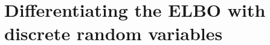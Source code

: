 \documentclass{article} %
\begin{document}
\begin{comment}
Our approach differs from a variational autoencoder in the grouping of the loss function.  Variational autoencoders efficiently backpropagate gradients of the loss function when the approximating posterior $q(z|x)$ consists of a differentiable, deterministic function of the combination of the inputs, the parameters, and a set of input- and parameter-independent random variables.  For instance, given a Gaussian distribution with mean and variance determined by the input, 
\begin{equation*}
\mathcal{N}\left(m(x), v(x) \right) \sim m(x) + \sqrt{v(x)} \cdot \mathcal{N}\left(0, 1 \right) .
\end{equation*}
In contrast, a comparable formulation is not possible for the distribution of equation~\ref{D-Wave-distribution}, implemented by the D-Wave~3.  
\end{comment}






\appendix

\section{Differentiating the ELBO with discrete random variables}





\end{document}
